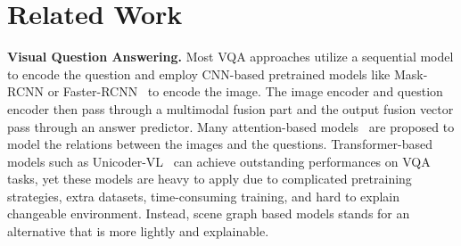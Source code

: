 \documentclass[letterpaper]{article} %
\begin{document}
\section{Related Work}
\noindent\textbf{Visual Question Answering.}
Most VQA approaches utilize a sequential model to encode the question and employ CNN-based pretrained models like Mask-RCNN or Faster-RCNN~\cite{DBLP:conf/cvpr/FanZ18,DBLP:conf/cvpr/PatroN18,DBLP:conf/cvpr/NamHK17} to encode the image.
The image encoder and question encoder then pass through a multimodal fusion part and the output fusion vector pass through an answer predictor.
Many attention-based models~\cite{DBLP:conf/cvpr/00010BT0GZ18,DBLP:conf/cvpr/YangHGDS16,DBLP:conf/eccv/XuS16,DBLP:conf/nips/LuYBP16,DBLP:conf/iclr/HudsonM18} are proposed to model the relations between the images and the questions.
Transformer-based models such as Unicoder-VL~\cite{DBLP:conf/aaai/LiDFGJ20} can achieve outstanding performances on VQA tasks, yet these models are heavy to apply due to complicated pretraining strategies, extra datasets, time-consuming training, and hard to explain changeable environment. 
Instead, scene graph based models stands for an alternative that is more lightly and explainable.
\end{document}
